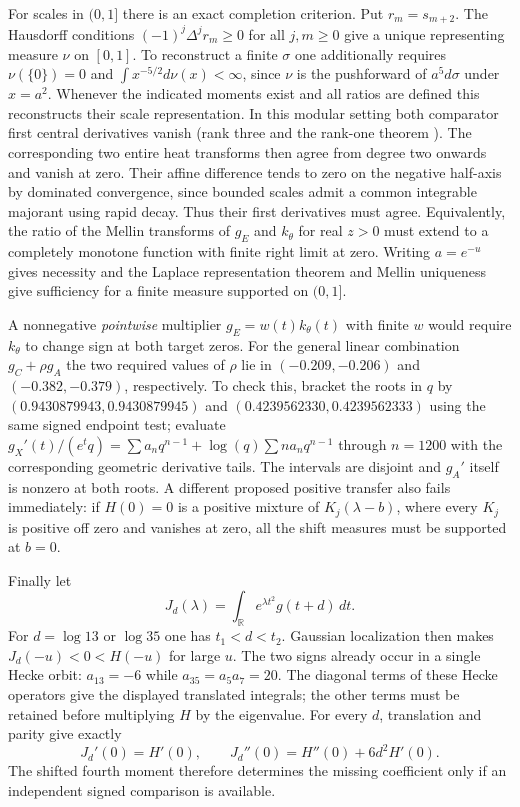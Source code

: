 \documentclass[11pt]{article}
\begin{document}
For scales in $(0,1]$ there is an exact completion criterion. Put
$r_m=s_{m+2}$. The Hausdorff conditions $(-1)^j\Delta^j r_m\ge0$
for all $j,m\ge0$ give a unique representing measure $\nu$ on $[0,1]$.
To reconstruct a finite $\sigma$ one additionally requires
$\nu(\{0\})=0$ and $\int x^{-5/2}d\nu(x)<\infty$, since $\nu$ is the
pushforward of $a^5d\sigma$ under $x=a^2$. Whenever the indicated
moments exist and all ratios are defined this reconstructs their
scale representation. In this modular setting both comparator first
central derivatives vanish (rank three and the rank-one theorem
\cite{lmfdbcomp,wiles}). The corresponding two entire heat transforms
then agree from degree two onwards and vanish at zero. Their affine
difference tends to zero on the negative half-axis by dominated
convergence, since bounded scales admit a common integrable
majorant using rapid decay. Thus their first derivatives must agree.
Equivalently, the ratio of the Mellin transforms of $g_E$ and $k_\theta$
for real $z>0$ must extend to a completely monotone function with finite
right limit at zero. Writing $a=e^{-u}$ gives necessity and the
Laplace representation theorem and Mellin uniqueness give sufficiency
for a finite measure supported on $(0,1]$.

A nonnegative \emph{pointwise} multiplier $g_E=w(t)k_\theta(t)$
with finite $w$ would require $k_\theta$ to change sign at both target
zeros. For the general linear combination $g_C+\rho g_A$ the two
required values of $\rho$ lie in $(-0.209,-0.206)$ and
$(-0.382,-0.379)$, respectively. To check this, bracket the roots
in $q$ by $(0.9430879943,0.9430879945)$ and
$(0.4239562330,0.4239562333)$ using the same signed endpoint test;
evaluate $g_X'(t)/(e^tq)=\sum a_nq^{n-1}+
\log(q)\sum n a_nq^{n-1}$ through $n=1200$ with the corresponding
geometric derivative tails. The intervals are disjoint and $g_A'$
itself is nonzero at both roots. A different proposed positive transfer
also fails immediately: if $H(0)=0$ is a positive mixture of
$K_j(\lambda-b)$, where every $K_j$ is positive off zero and vanishes
at zero, all the shift measures must be supported at $b=0$.

Finally let
\[
 J_d(\lambda)=\int_{\mathbb R} e^{\lambda t^2}g(t+d)\,dt .
\]
For $d=\log13$ or $\log35$ one has $t_1<d<t_2$. Gaussian localization
then makes $J_d(-u)<0<H(-u)$ for large $u$. The two signs already occur in a single Hecke orbit:
$a_{13}=-6$ while $a_{35}=a_5a_7=20$. The diagonal terms of these
Hecke operators give the displayed translated integrals; the other
terms must be retained before multiplying $H$ by the eigenvalue.
For every $d$, translation and parity give exactly
\[
 J_d'(0)=H'(0),\qquad
 J_d''(0)=H''(0)+6d^2H'(0).
\]
The shifted fourth moment therefore determines the missing coefficient
only if an independent signed comparison is available.
\end{document}
